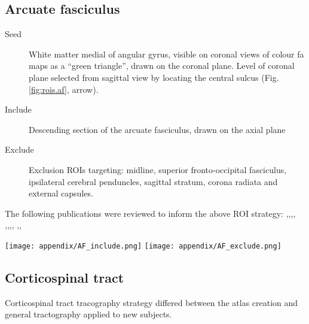 \subsection{Arcuate fasciculus}

\begin{description}
  \item[Seed] White matter medial of angular gyrus, visible on coronal views of colour \gls{fa} maps as a ``green triangle'', drawn on the coronal plane.
  Level of coronal plane selected from sagittal view by locating the central sulcus (Fig. \ref{fig:rois.af}, arrow).
  \item[Include] Descending section of the arcuate fasciculus, drawn on the axial plane
  \item[Exclude] Exclusion ROIs targeting: midline, superior fronto-occipital fasciculus, ipsilateral cerebral penduncles, sagittal stratum, corona radiata and external capsules.
\end{description}

The following publications were reviewed to inform the above ROI strategy: \textcite{Brown2014a},\textcite{Catani2002},\textcite{Catani2005},\textcite{Chen2015c},
\textcite{Eluvathingal2007},\textcite{Kamali2014},\textcite{Martino2013a},\textcite{Nucifora2005},
\textcite{Parker2005},\textcite{Bain2019},\textcite{Talozzi2018}

\begin{figure*}[h]
  \centering
    \texttt{[image: appendix/AF\_include.png]}
    \texttt{[image: appendix/AF\_exclude.png]}
  \caption[Arcuate fasciculus tractography ROIs]{Seed (yellow), inclusion (green) and exclusion (red) \glspl{roi} for the arcuate fasciculus. Arrow indicates central sulcus, landmark for seed ROI.}
  \label{fig:rois.af}
\end{figure*}

\subsection{Corticospinal tract}

Corticospinal tract tracography strategy differed between the atlas creation and general tractography applied to new subjects.

